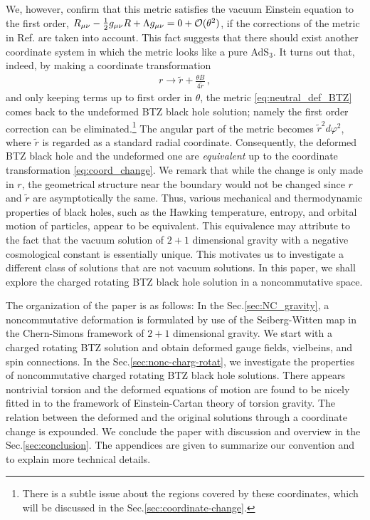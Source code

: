 \documentclass[11pt]{article}
\newcommand{\vap}{\varphi}
\numberwithin{equation}{section}
\begin{document}
We, however, confirm that this metric satisfies the vacuum Einstein 
equation to the first order, 
$R_{\mu\nu}-\frac{1}{2}g_{\mu\nu}R+\Lambda g_{\mu\nu}=0+{\cal O}(\theta^2)$,
if the corrections of the metric in Ref.\cite{ChangYoung:2008my}
are taken into account.
This fact suggests that there should exist
another coordinate system in which the metric looks like a pure AdS${}_3$.
It turns out that, indeed, by making a coordinate transformation
\begin{align}
  r \rightarrow \tilde{r} +\frac{\theta B}{4\tilde{r}} \,,
\label{eq:coord_change}
\end{align}
and only keeping terms up to first order in $\theta$, the metric \eqref{eq:neutral_def_BTZ} comes back
to the undeformed BTZ black hole solution; namely the first order
correction can be eliminated.\footnote{%
There is a subtle issue about the regions covered by these
coordinates, which will be discussed in the Sec.\ref{sec:coordinate-change}.}
The angular part of the metric becomes $\tilde{r}^2 d\vap^2$, where $\tilde{r}$ is regarded as a standard radial coordinate.
Consequently, the deformed BTZ black
hole and the undeformed one are {\sl equivalent} up to the coordinate transformation \eqref{eq:coord_change}.
We remark that while the change is only made in $r$, the geometrical structure near the boundary would not be changed since $r$ and $\tilde{r}$ are asymptotically the same.  Thus, various mechanical and thermodynamic properties of black holes, such as the Hawking temperature, entropy, and orbital motion of particles, appear to be equivalent.
This equivalence may attribute to the fact that the vacuum solution of $2+1$
dimensional gravity with a negative cosmological constant is essentially
unique.
This motivates us to investigate a different class of solutions that are not
vacuum solutions.  In this paper, we shall explore the charged rotating BTZ
black hole solution in a noncommutative space.


The organization of the paper is as follows:
In the Sec.\ref{sec:NC_gravity}, a noncommutative deformation is
formulated by use of the Seiberg-Witten map in the Chern-Simons
framework of $2+1$ dimensional gravity.
We start with a charged rotating BTZ solution and obtain deformed
gauge fields, vielbeins, and spin connections.
In the Sec.\ref{sec:nonc-charg-rotat}, we investigate the properties of 
noncommutative charged rotating BTZ black hole solutions.
There appears nontrivial torsion and the deformed equations of motion 
are found to be nicely fitted in to the framework of
Einstein-Cartan theory of torsion gravity.
The relation between the deformed and the original solutions
through a coordinate change is expounded.
We conclude the paper with discussion and overview in
the Sec.\ref{sec:conclusion}.
The appendices are given to summarize our convention and to explain more technical details.
\end{document}
